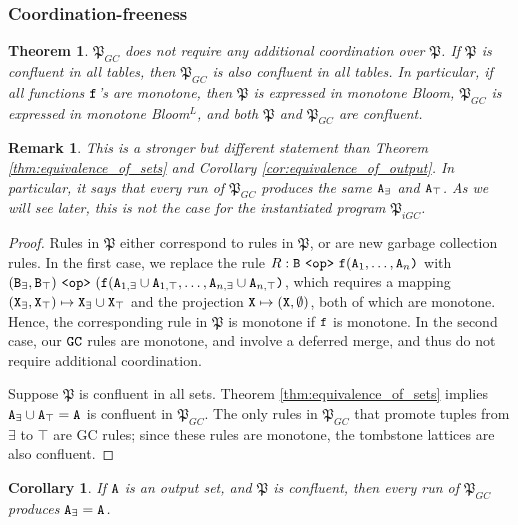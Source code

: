 \documentclass{article}
\numberwithin{equation}{section}
\newtheorem{thm}[theorem]{Theorem}
\newtheorem{cor}[theorem]{Corollary}
\newtheorem{rmk}{Remark}[section]
\renewcommand{\tt}[1]{\ifmmode\text{\texttt{#1}}\else\texttt{#1}\fi}
\begin{document}
\subsubsection{Coordination-freeness}

\begin{thm}
\label{thm:coord-free}
$\mathfrak{P}_{GC}$ does not require any additional coordination over $\mathfrak{P}$.
If $\mathfrak{P}$ is confluent in all tables, then $\mathfrak{P}_{GC}$ is also confluent in all tables.
In particular, if all functions $\tt{f}$'s are monotone, then $\mathfrak{P}$ is expressed in monotone Bloom, $\mathfrak{P}_{GC}$ is expressed in monotone Bloom$^L$, and both $\mathfrak{P}$ and $\mathfrak{P}_{GC}$ are confluent.
\end{thm}
\begin{rmk}
This is a stronger but different statement than Theorem \ref{thm:equivalence_of_sets} and Corollary \ref{cor:equivalence_of_output}.
In particular, it says that every run of $\mathfrak{P}_{GC}$ produces the same $\tt{A}_\exists$ and $\tt{A}_\top$.
As we will see later, this is not the case for the instantiated program $\mathfrak{P}_{iGC}$.
\end{rmk}
\begin{proof}
Rules in $\mathfrak{P}$ either correspond to rules in $\mathfrak{P}$, or are new garbage collection rules.
In the first case, we replace the rule $R: \tt{B} ~\tt{<op>}~ \tt{f}(\tt{A}_1,\dots,\tt{A}_n\tt{)}$ with $(\tt{B}_\exists, \tt{B}_\top) ~\tt{<op>}~ (\tt{f}(\tt{A}_{1,\exists} \cup \tt{A}_{1,\top}, \dots, \tt{A}_{n,\exists} \cup \tt{A}_{n,\top} \tt{)}$, which requires a mapping $(\tt{X}_\exists, \tt{X}_\top) \mapsto \tt{X}_\exists \cup \tt{X}_\top$ and the projection $\tt{X} \mapsto (\tt{X}, \emptyset)$, both of which are monotone.
Hence, the corresponding rule in $\mathfrak{P}$ is monotone if $\tt{f}$ is monotone.
In the second case, our $\tt{GC}$ rules are monotone, and involve a deferred merge, and thus do not require additional coordination.

Suppose $\mathfrak{P}$ is confluent in all sets.
Theorem \ref{thm:equivalence_of_sets} implies $\tt{A}_{\exists} \cup \tt{A}_\top = \tt{A}$ is confluent in $\mathfrak{P}_{GC}$.
The only rules in $\mathfrak{P}_{GC}$ that promote tuples from $\exists$ to $\top$ are GC rules; since these rules are monotone, the tombstone lattices are also confluent.
\end{proof}

\begin{cor}
\label{cor:confluence_of_output}
If $\tt{A}$ is an output set, and $\mathfrak{P}$ is confluent, then every run of $\mathfrak{P}_{GC}$ produces $\tt{A}_\exists = \tt{A}$.
\end{cor}
\end{document}
